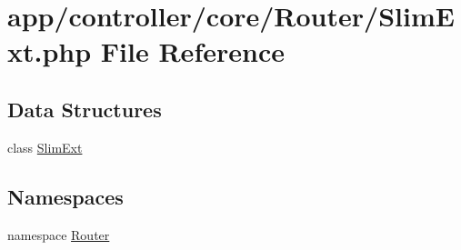 \hypertarget{_slim_ext_8php}{\section{app/controller/core/\-Router/\-Slim\-Ext.php File Reference}
\label{_slim_ext_8php}
}
\subsection*{Data Structures}
\begin{DoxyCompactItemize}
\item 
class \hyperlink{class_router_1_1_slim_ext}{Slim\-Ext}
\end{DoxyCompactItemize}
\subsection*{Namespaces}
\begin{DoxyCompactItemize}
\item 
namespace \hyperlink{namespace_router}{Router}
\end{DoxyCompactItemize}
